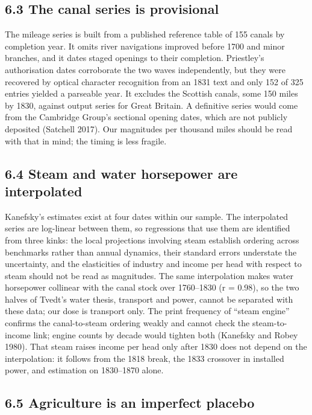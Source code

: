 \documentclass[
  11pt,
]{article}
\begin{document}
\subsection{6.3 The canal series is
provisional}\label{the-canal-series-is-provisional}

The mileage series is built from a published reference table of 155
canals by completion year. It omits river navigations improved before
1700 and minor branches, and it dates staged openings to their
completion. Priestley's authorisation dates corroborate the two waves
independently, but they were recovered by optical character recognition
from an 1831 text and only 152 of 325 entries yielded a parseable year.
It excludes the Scottish canals, some 150 miles by 1830, against output
series for Great Britain. A definitive series would come from the
Cambridge Group's sectional opening dates, which are not publicly
deposited (Satchell 2017). Our magnitudes per thousand miles should be
read with that in mind; the timing is less fragile.

\subsection{6.4 Steam and water horsepower are
interpolated}\label{steam-and-water-horsepower-are-interpolated}

Kanefsky's estimates exist at four dates within our sample. The
interpolated series are log-linear between them, so regressions that use
them are identified from three kinks: the local projections involving
steam establish ordering across benchmarks rather than annual dynamics,
their standard errors understate the uncertainty, and the elasticities
of industry and income per head with respect to steam should not be read
as magnitudes. The same interpolation makes water horsepower collinear
with the canal stock over 1760--1830 (r = 0.98), so the two halves of
Tvedt's water thesis, transport and power, cannot be separated with
these data; our dose is transport only. The print frequency of ``steam
engine'' confirms the canal-to-steam ordering weakly and cannot check
the steam-to-income link; engine counts by decade would tighten both
(Kanefsky and Robey 1980). That steam raises income per head only after
1830 does not depend on the interpolation: it follows from the 1818
break, the 1833 crossover in installed power, and estimation on
1830--1870 alone.

\subsection{6.5 Agriculture is an imperfect
placebo}\label{agriculture-is-an-imperfect-placebo}
\end{document}
